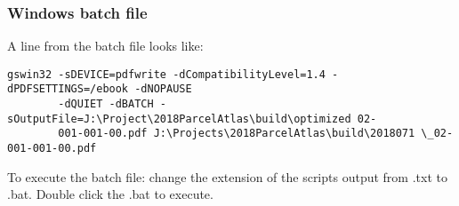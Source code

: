 \subsubsection{Windows batch file}
A line from the batch file looks like:
{\begin{footnotesize}\color{orange}
\begin{verbatim}
gswin32 -sDEVICE=pdfwrite -dCompatibilityLevel=1.4 -dPDFSETTINGS=/ebook -dNOPAUSE
        -dQUIET -dBATCH -sOutputFile=J:\Project\2018ParcelAtlas\build\optimized 02-
        001-001-00.pdf J:\Projects\2018ParcelAtlas\build\2018071 \_02-001-001-00.pdf
\end{verbatim}
\end{footnotesize}}

\noindent To execute the batch file: change the extension of the scripts output from .txt to .bat.  Double click the .bat to execute.




